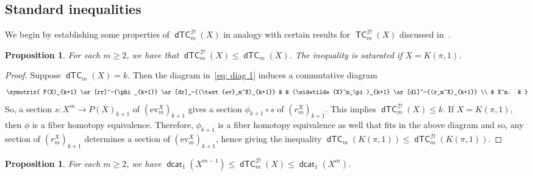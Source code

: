 \documentclass[amscd,amssymb,verbatim,11pt]{amsart}
\theoremstyle{plain}
\newtheorem{proposition}[thm]{Proposition}
\theoremstyle{definition}
\newcommand{\Wi}{\widetilde}
\DeclareMathOperator{\TC}{{\mathsf{TC}}}
\DeclareMathOperator{\dcat}{{\mathsf{dcat}}}
\DeclareMathOperator{\dTC}{{\mathsf{dTC}}}
\newcommand{\D}{\mathcal{D}}
\begin{document}
\subsection{Standard inequalities}
We begin by establishing some properties of $\dTC_m^{\D}(X)$ in analogy with certain 
results for $\TC_m^{\D}(X)$ discussed in~\cite{FO,PS}.

\begin{proposition}\label{prop: dtcD vs dtc}
    For each $m\ge 2$, we have that $\dTC_m^{\D}(X)\le\dTC_m(X)$. The inequality is saturated if $X=K(\pi,1)$.
\end{proposition}

\begin{proof}
    Suppose $\dTC_m(X)=k$. Then the diagram in~\eqref{eq: diag 1} induces a commutative diagram
    $$
    \xymatrix{
P(X)_{k+1} \ar[rr]^-{\phi_{k+1}} \ar[dr]_-{(\text{ev}_m^X)_{k+1}} & & (\Wi{X}^m_\pi)_{k+1} \ar[dl]^-{(r_m^X)_{k+1}} \\
& X^m. &
}
    $$
    So, a section $s\colon X^m\to P(X)_{k+1}$ of $(\text{ev}_m^X)_{k+1}$ gives a section $\phi_{k+1}\circ s$ of $(r_m^X)_{k+1}$. This implies $\dTC_m^{\D}(X)\le k$. If $X=K(\pi,1)$, then $\phi$ is a fiber homotopy equivalence. Therefore, $\phi_{k+1}$ is a fiber homotopy equivalence as well that fits in the above diagram and so, any section of $(r_m^X)_{k+1}$ determines a section of $(\text{ev}_m^X)_{k+1}$, hence giving the inequality $\dTC_m(K(\pi,1))\le\dTC_m^{\D}(K(\pi,1))$.
\end{proof}

\begin{proposition}\label{prop: dtcD vs dcat1}
    For each $m\ge 2$, we have $\dcat_1(X^{m-1})\le\dTC^{\D}_m(X)\le\dcat_1(X^m)$.
\end{proposition}
\end{document}
